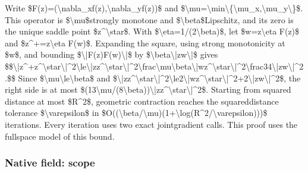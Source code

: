 \documentclass[10pt,a4paper]{article}
\begin{document}
Write \$F(z)=(\textbackslash{}nabla\_xf(z),\textbackslash{}nabla\_yf(z))\$ and \$\textbackslash{}mu=\textbackslash{}min\textbackslash{}\{\textbackslash{}mu\_x,\textbackslash{}mu\_y\textbackslash{}\}\$. This operator is \$\textbackslash{}mu\$strongly monotone and \$\textbackslash{}beta\$Lipschitz, and its zero is the unique saddle point \$z\textasciicircum{}\textbackslash{}star\$. With \$\textbackslash{}eta=1/(2\textbackslash{}beta)\$, let \$w=z\textbackslash{}eta F(z)\$ and \$z\textasciicircum{}+=z\textbackslash{}eta F(w)\$. Expanding the square, using strong monotonicity at \$w\$, and bounding \$\textbackslash{}|F(z)F(w)\textbackslash{}|\$ by \$\textbackslash{}beta\textbackslash{}|zw\textbackslash{}|\$ gives
\$\$\textbackslash{}|z\textasciicircum{}+z\textasciicircum{}\textbackslash{}star\textbackslash{}|\textasciicircum{}2\textbackslash{}le\textbackslash{}|\allowbreak{}zz\textasciicircum{}\textbackslash{}star\textbackslash{}|\textasciicircum{}2\textbackslash{}frac\textbackslash{}mu\textbackslash{}b\allowbreak{}eta\textbackslash{}|wz\textasciicircum{}\textbackslash{}star\textbackslash{}|\textasciicircum{}2\textbackslash{}frac\allowbreak{}34\textbackslash{}|zw\textbackslash{}|\textasciicircum{}2.\$\$
Since \$\textbackslash{}mu\textbackslash{}le\textbackslash{}beta\$ and \$\textbackslash{}|zz\textasciicircum{}\textbackslash{}star\textbackslash{}|\textasciicircum{}2\textbackslash{}le2\textbackslash{}|w\allowbreak{}z\textasciicircum{}\textbackslash{}star\textbackslash{}|\textasciicircum{}2+2\textbackslash{}|zw\textbackslash{}|\textasciicircum{}2\$, the right side is at most \$(13\textbackslash{}mu/(8\textbackslash{}beta))\textbackslash{}|zz\textasciicircum{}\textbackslash{}star\textbackslash{}|\textasciicircum{}2\$. Starting from squared distance at most \$R\textasciicircum{}2\$, geometric contraction reaches the squareddistance tolerance \$\textbackslash{}varepsilon\$ in \$O((\textbackslash{}beta/\textbackslash{}mu)(1+\textbackslash{}log(R\textasciicircum{}\allowbreak{}2/\textbackslash{}varepsilon)))\$ iterations. Every iteration uses two exact jointgradient calls. This proof uses the fullspace model of this bound.


\subsubsection{Native field: scope}
\end{document}

